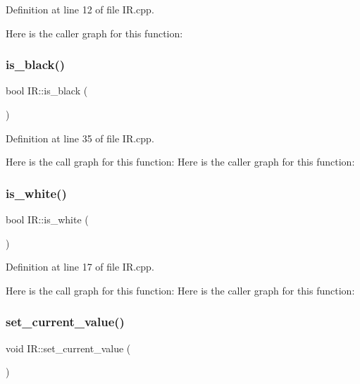 Definition at line 12 of file I\+R.\+cpp.

Here is the caller graph for this function\+:
\mbox{\label{class_i_r_a2f62691ee90ca2a9035c088029dab4bb}} 
\subsubsection{\texorpdfstring{is\+\_\+black()}{is\_black()}}
{\footnotesize\ttfamily bool I\+R\+::is\+\_\+black (\begin{DoxyParamCaption}{ }\end{DoxyParamCaption})}



Definition at line 35 of file I\+R.\+cpp.

Here is the call graph for this function\+:
Here is the caller graph for this function\+:
\mbox{\label{class_i_r_ae05cf1ad5888262586007946f21ac14e}} 
\subsubsection{\texorpdfstring{is\+\_\+white()}{is\_white()}}
{\footnotesize\ttfamily bool I\+R\+::is\+\_\+white (\begin{DoxyParamCaption}{ }\end{DoxyParamCaption})}



Definition at line 17 of file I\+R.\+cpp.

Here is the call graph for this function\+:
Here is the caller graph for this function\+:
\mbox{\label{class_i_r_a2d60cbf66f48bad8167e2c4231ed3f95}} 
\subsubsection{\texorpdfstring{set\+\_\+current\+\_\+value()}{set\_current\_value()}}
{\footnotesize\ttfamily void I\+R\+::set\+\_\+current\+\_\+value (\begin{DoxyParamCaption}{ }\end{DoxyParamCaption})}



